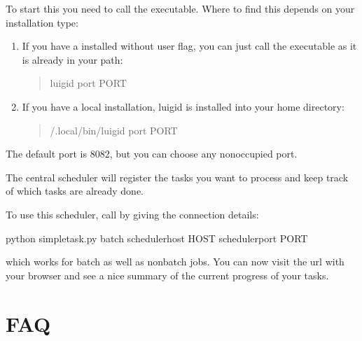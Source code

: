 \documentclass[letterpaper,10pt,english]{sphinxmanual}
\begin{document}
To start this you need to call the  executable.
Where to find this depends on your installation type:
\begin{enumerate}
%
\item {} 
If you have a installed  without user flag, you can just call the executable as it is already in your path:
\begin{quote}

\begin{sphinxVerbatim}[commandchars=\\\{\}]
luigid \PYGZhy{}\PYGZhy{}port PORT
\end{sphinxVerbatim}
\end{quote}

\item {} 
If you have a local installation, luigid is installed into your home directory:
\begin{quote}

\begin{sphinxVerbatim}[commandchars=\\\{\}]
\PYGZti{}/.local/bin/luigid \PYGZhy{}\PYGZhy{}port PORT
\end{sphinxVerbatim}
\end{quote}

\end{enumerate}

The default port is 8082, but you can choose any non\sphinxhyphen{}occupied port.

The central scheduler will register the tasks you want to process and keep track of which tasks are already done.

To use this scheduler, call  by giving the connection details:

\begin{sphinxVerbatim}[commandchars=\\\{\}]
python simple\PYGZhy{}task.py \PYG{o}{[}\PYGZhy{}\PYGZhy{}batch\PYG{o}{]} \PYGZhy{}\PYGZhy{}scheduler\PYGZhy{}host HOST \PYGZhy{}\PYGZhy{}scheduler\PYGZhy{}port PORT
\end{sphinxVerbatim}

which works for batch as well as non\sphinxhyphen{}batch jobs.
You can now visit the url  with your browser and see a nice summary of the current progress
of your tasks.


\section{FAQ}
\label{\detokenize{advanced/faq:faq}}\label{\detokenize{advanced/faq:faq-label}}\label{\detokenize{advanced/faq::doc}}
\end{document}
